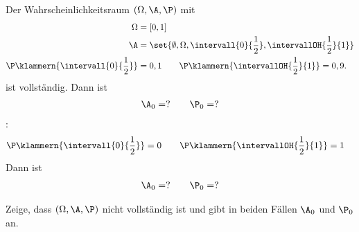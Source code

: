 \begin{beisp}
	Der Wahrscheinlichkeitsraum $(\Omega,\A,\P)$ mit
	\begin{align*}
		\Omega&=[0,1]\\
		\A&=\set{\emptyset,\Omega,\intervall{0}{\frac{1}{2}},\intervallOH{\frac{1}{2}}{1}}\\
		\P\klammern{\intervall{0}{\frac{1}{2}}}&=0,1\qquad\P\klammern{\intervallOH{\frac{1}{2}}{1}}=0,9.
	\end{align*}		
	ist  vollständig.
	 Dann ist
	 \begin{align*}
	 	\A_0=?\qquad\P_0=?
	 \end{align*}
	 :
	 \begin{align*}
	 	\P\klammern{\intervall{0}{\frac{1}{2}}}&=0\qquad\P\klammern{\intervallOH{\frac{1}{2}}{1}}=1
	 \end{align*}
	  Dann ist
	 \begin{align*}
	 	\A_0=?\qquad\P_0=?
	 \end{align*}

	\begin{aufgabenr}\label{aufg:4}\enter
	 	Zeige, dass $(\Omega,\A,\P)$ nicht vollständig ist und gibt in beiden Fällen $\A_0$ und $\P_0$ an.
	\end{aufgabenr}
\end{beisp}

